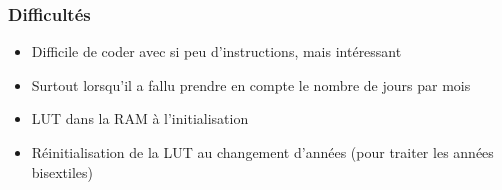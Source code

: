 \documentclass{beamer}
\begin{document}
	
			\begin{frame}
		\frametitle{Difficultés}
\begin{itemize}
	\item Difficile de coder avec si peu d'instructions, mais intéressant
	\item Surtout lorsqu'il a fallu prendre en compte le nombre de jours par mois
	\item LUT dans la RAM à l'initialisation
	\item Réinitialisation de la LUT au changement d'années (pour traiter les années bisextiles)
	\end{itemize}
	\end{frame} 
	
\end{document}
